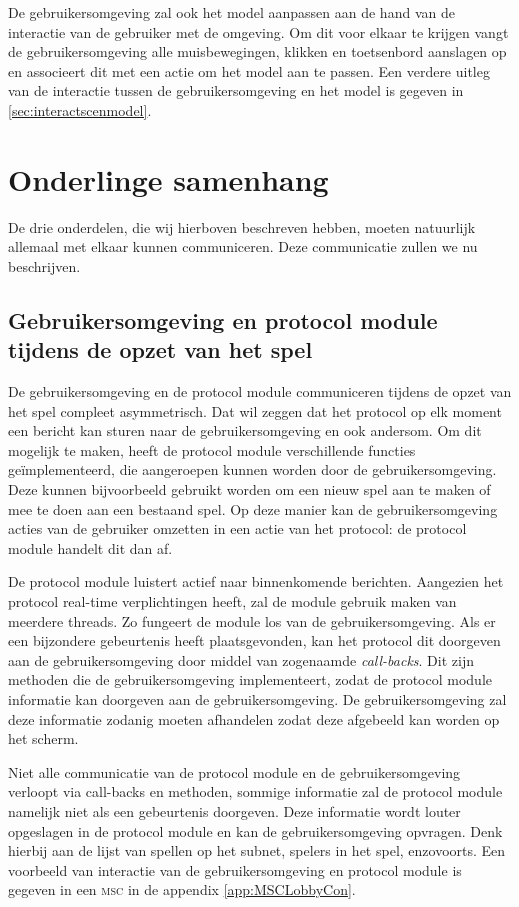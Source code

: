\documentclass[a4paper,11pt]{article}
\begin{document}
	De gebruikersomgeving zal ook het model aanpassen aan de hand van de interactie van de gebruiker met de omgeving. Om dit voor elkaar te krijgen vangt de gebruikersomgeving alle muisbewegingen, klikken en toetsenbord aanslagen op en associeert dit met een actie om het model aan te passen. Een verdere uitleg van de interactie tussen de gebruikersomgeving en het model is gegeven in \ref{sec:interactscenmodel}.

    \section{Onderlinge samenhang}
    De drie onderdelen, die wij hierboven beschreven hebben, moeten natuurlijk allemaal met elkaar kunnen communiceren. Deze communicatie zullen we nu beschrijven.

    \subsection{Gebruikersomgeving en protocol module tijdens de opzet van het spel}
    De gebruikersomgeving en de protocol module communiceren tijdens de opzet van het spel compleet asymmetrisch. Dat wil zeggen dat het protocol op elk moment een bericht kan sturen naar de gebruikersomgeving en ook andersom. Om dit mogelijk te maken, heeft de protocol module verschillende functies ge\"implementeerd, die aangeroepen kunnen worden door de gebruikersomgeving. Deze kunnen bijvoorbeeld gebruikt worden om een nieuw spel aan te maken of mee te doen aan een bestaand spel. Op deze manier kan de gebruikersomgeving acties van de gebruiker omzetten in een actie van het protocol: de protocol module handelt dit dan af.

    De protocol module luistert actief naar binnenkomende berichten. Aangezien het protocol real-time verplichtingen heeft, zal de module gebruik maken van meerdere threads. Zo fungeert de module los van de gebruikersomgeving. Als er een bijzondere gebeurtenis heeft plaatsgevonden, kan het protocol dit doorgeven aan de gebruikersomgeving door middel van zogenaamde \emph{call-backs}. Dit zijn methoden die de gebruikersomgeving implementeert, zodat de protocol module informatie kan doorgeven aan de gebruikersomgeving. De gebruikersomgeving zal deze informatie zodanig moeten afhandelen zodat deze afgebeeld kan worden op het scherm.

    Niet alle communicatie van de protocol module en de gebruikersomgeving verloopt via call-backs en methoden, sommige informatie zal de protocol module namelijk niet als een gebeurtenis doorgeven. Deze informatie wordt louter opgeslagen in de protocol module en kan de gebruikersomgeving opvragen. Denk hierbij aan de lijst van spellen op het subnet, spelers in het spel, enzovoorts. Een voorbeeld van interactie van de gebruikersomgeving en protocol module is gegeven in een \textsc{msc} in de appendix \ref{app:MSCLobbyCon}.
\end{document}
